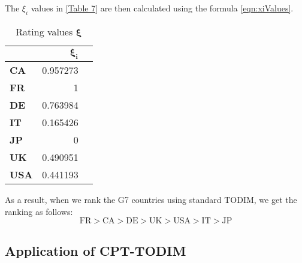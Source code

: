 \documentclass{infor}
\theoremstyle{remark}
\begin{document}
\begin{steps}
The \(\xi_{i}\) values in \autoref{Table 7} are then calculated
using the formula \eqref{eqn:xiValues}.

\begin{table}[!htp]\centering
\caption{Rating values \(\mathbf{\xi}\)}\label{Table 7} 
\scriptsize
\begin{tabular}{lrr}\toprule
& \(\mathbf{\xi}_{\mathbf{i}}\)\\ \toprule

\textbf{CA} & 0.957273\\
\textbf{FR} & 1\\
\textbf{DE} & 0.763984\\
\textbf{IT} & 0.165426\\
\textbf{JP} & 0\\
\textbf{UK} & 0.490951\\
\textbf{USA} & 0.441193\\
\bottomrule
\end{tabular}
\end{table}
\end{steps}
As a result, when we rank the G7 countries using standard TODIM, we get the ranking as follows:
\begin{equation}
\text{FR} > \text{CA} > \text{DE} > \text{UK} > \text{USA} > \text{IT} > \text{JP}
\end{equation}
\subsection{Application of CPT-TODIM}
\end{document}
